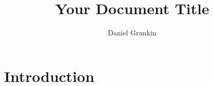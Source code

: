 \documentclass{article}
\title{Your Document Title}
\author{Daniel Grunkin}
\date{}
\numberwithin{equation}{section}
\begin{document}
\maketitle



\tableofcontents
\newpage


\section{Introduction}
\end{document}
